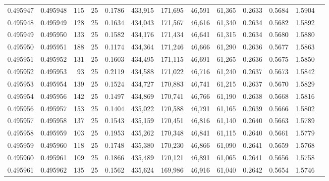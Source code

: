 \begin{tabular}{rrrrrrrrrrrrr}
0.495947 & 0.495948 &   115 &  25 &                                     0.1786 & 433,915 & 171,695 &  46,591 &  61,365 & 0.2633 & 0.5684 & 1.5904 \\
0.495948 & 0.495949 &   128 &  25 &                                     0.1634 & 434,043 & 171,567 &  46,616 &  61,340 & 0.2634 & 0.5682 & 1.5892 \\
0.495949 & 0.495950 &   133 &  25 &                                     0.1582 & 434,176 & 171,434 &  46,641 &  61,315 & 0.2634 & 0.5680 & 1.5880 \\
0.495950 & 0.495951 &   188 &  25 &                                     0.1174 & 434,364 & 171,246 &  46,666 &  61,290 & 0.2636 & 0.5677 & 1.5863 \\
0.495951 & 0.495952 &   131 &  25 &                                     0.1603 & 434,495 & 171,115 &  46,691 &  61,265 & 0.2636 & 0.5675 & 1.5850 \\
0.495952 & 0.495953 &    93 &  25 &                                     0.2119 & 434,588 & 171,022 &  46,716 &  61,240 & 0.2637 & 0.5673 & 1.5842 \\
0.495953 & 0.495954 &   139 &  25 &                                     0.1524 & 434,727 & 170,883 &  46,741 &  61,215 & 0.2637 & 0.5670 & 1.5829 \\
0.495954 & 0.495956 &   142 &  25 &                                     0.1497 & 434,869 & 170,741 &  46,766 &  61,190 & 0.2638 & 0.5668 & 1.5816 \\
0.495956 & 0.495957 &   153 &  25 &                                     0.1404 & 435,022 & 170,588 &  46,791 &  61,165 & 0.2639 & 0.5666 & 1.5802 \\
0.495957 & 0.495958 &   137 &  25 &                                     0.1543 & 435,159 & 170,451 &  46,816 &  61,140 & 0.2640 & 0.5663 & 1.5789 \\
0.495958 & 0.495959 &   103 &  25 &                                     0.1953 & 435,262 & 170,348 &  46,841 &  61,115 & 0.2640 & 0.5661 & 1.5779 \\
0.495959 & 0.495960 &   118 &  25 &                                     0.1748 & 435,380 & 170,230 &  46,866 &  61,090 & 0.2641 & 0.5659 & 1.5768 \\
0.495960 & 0.495961 &   109 &  25 &                                     0.1866 & 435,489 & 170,121 &  46,891 &  61,065 & 0.2641 & 0.5656 & 1.5758 \\
0.495961 & 0.495962 &   135 &  25 &                                     0.1562 & 435,624 & 169,986 &  46,916 &  61,040 & 0.2642 & 0.5654 & 1.5746 \\

\end{tabular}
